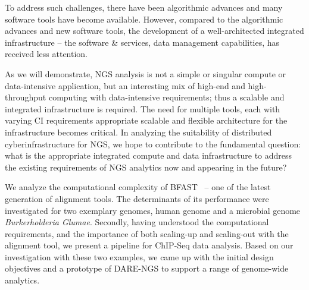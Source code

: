 \documentclass{cpeauth}
\begin{document}

To address such challenges, there have been algorithmic advances and
many software tools have become
available\cite{trapnell2009,bfast2009,scheibye-alsing2009,pepke2009,samtools}.
However, compared to the algorithmic advances and new software tools,
the development of a well-architected integrated infrastructure -- the
software \& services, data management capabilities, has received less
attention.

As we will demonstrate, NGS analysis is not a simple or singular
compute or data-intensive application, but an interesting mix of
high-end and high-throughput computing with data-intensive
requirements; thus a scalable and integrated infrastructure is
required. The need for multiple tools, each with varying CI
requirements appropriate scalable and flexible architecture for the
infrastructure becomes critical. %
In analyzing the suitability of distributed cyberinfrastructure for
NGS, we hope to contribute to the fundamental question: what is the
appropriate integrated compute and data infrastructure to address the
existing requirements of NGS analytics now and appearing in the
future?


We analyze the computational complexity of BFAST~\cite{bfast2009,
  bfast2009b} -- one of the latest generation of alignment tools.  The
determinants of its performance were investigated for two exemplary
genomes, human genome and a microbial genome {\it Burkerholderia
  Glumae}\cite{kim2011}.  Secondly, having understood the
computational requirements, and the importance of both scaling-up and
scaling-out with the alignment tool, we present a pipeline for
ChIP-Seq data analysis.  Based on our investigation with these two
examples, we came up with the initial design objectives and a
prototype of DARE-NGS to support a range of genome-wide analytics.
 
\end{document}
